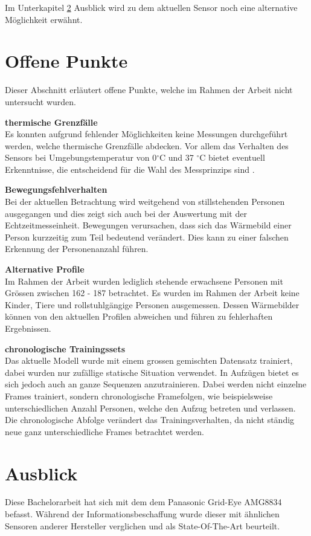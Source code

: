 Im Unterkapitel \ref{sec:Ausblick} Ausblick  wird zu dem aktuellen Sensor noch eine alternative Möglichkeit erwähnt. 
\newpage

\section{Offene Punkte}
\label{sec:OffenePunkte}
Dieser Abschnitt erläutert offene Punkte, welche im Rahmen der Arbeit nicht untersucht wurden.

\textbf{thermische Grenzfälle}\\
Es konnten aufgrund fehlender Möglichkeiten keine Messungen durchgeführt werden, welche thermische Grenzfälle abdecken. Vor allem das Verhalten des Sensors bei Umgebungstemperatur von 0$ ^\circ$C und 37 $^\circ$C bietet eventuell Erkenntnisse, die entscheidend für die Wahl des Messprinzips sind .

\textbf{Bewegungsfehlverhalten}\\
Bei der aktuellen Betrachtung wird weitgehend von stillstehenden Personen ausgegangen und dies zeigt sich auch bei der Auswertung mit der Echtzeitmesseinheit. Bewegungen verursachen, dass sich das Wärmebild einer Person kurzzeitig zum Teil bedeutend verändert. Dies kann zu einer falschen Erkennung der Personenanzahl führen. 

\textbf{Alternative Profile}\\
Im Rahmen der Arbeit wurden lediglich stehende erwachsene Personen mit Grössen zwischen 162 - 187 betrachtet. Es wurden im Rahmen der Arbeit keine Kinder, Tiere und rollstuhlgängige Personen ausgemessen. Dessen Wärmebilder können von den aktuellen Profilen abweichen und führen zu fehlerhaften Ergebnissen.

\textbf{chronologische Trainingssets}\\
Das aktuelle Modell wurde mit einem grossen gemischten Datensatz trainiert, dabei wurden nur zufällige statische Situation verwendet. In Aufzügen bietet es sich jedoch auch an ganze Sequenzen anzutrainieren. Dabei werden nicht einzelne Frames trainiert, sondern chronologische Framefolgen, wie beispielsweise unterschiedlichen Anzahl Personen, welche den Aufzug betreten und verlassen. Die chronologische Abfolge verändert das Trainingsverhalten, da nicht ständig neue ganz unterschiedliche Frames betrachtet werden.

\newpage
\section{Ausblick}
\label{sec:Ausblick}
Diese Bachelorarbeit hat sich mit dem dem Panasonic Grid-Eye AMG8834 befasst. Während der Informationsbeschaffung wurde dieser mit ähnlichen Sensoren anderer Hersteller verglichen und als State-Of-The-Art beurteilt. 

